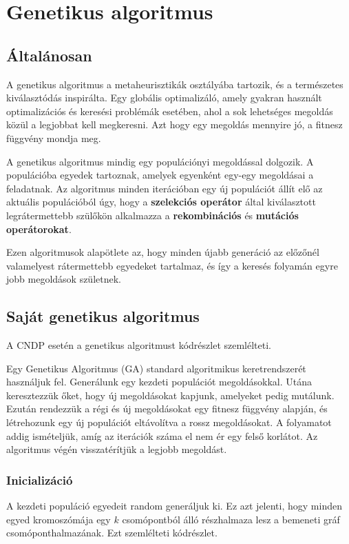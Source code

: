 \section{Genetikus algoritmus}\label{sec:GENETIKUS_ALGORITMUS}


\subsection{Általánosan}
A genetikus algoritmus a metaheurisztikák osztályába tartozik, és a természetes kiválasztódás inspirálta.
Egy globális optimalizáló, amely gyakran használt optimalizációs és keresési problémák esetében,
ahol a sok lehetséges megoldás közül a legjobbat kell megkeresni.
Azt hogy egy megoldás mennyire jó, a fitnesz függvény mondja meg.

A genetikus algoritmus mindig egy populációnyi megoldással dolgozik.
A populációba egyedek tartoznak, amelyek egyenként egy-egy megoldásai a feladatnak.
Az algoritmus minden iterációban egy új populációt állít elő az aktuális populációból úgy,
hogy a \textbf{szelekciós operátor} által kiválasztott legrátermettebb szülőkön alkalmazza a
\textbf{rekombinációs} és \textbf{mutációs operátorokat}.

Ezen algoritmusok alapötlete az, hogy minden újabb generáció
az előzőnél valamelyest rátermettebb egyedeket tartalmaz, és így a keresés folyamán
egyre jobb megoldások születnek.

\subsection{Saját genetikus algoritmus}
A CNDP esetén a genetikus algoritmust  kódrészlet szemlélteti.


Egy Genetikus Algoritmus (GA) standard algoritmikus keretrendszerét használjuk fel.
Generálunk egy kezdeti populációt megoldásokkal. Utána keresztezzük őket, hogy új megoldásokat kapjunk,
amelyeket pedig mutálunk. Ezután rendezzük a régi és új megoldásokat egy fitnesz függvény alapján,
és létrehozunk egy új populációt eltávolítva a rossz megoldásokat.
A folyamatot addig ismételjük, amíg az iterációk száma el nem ér egy felső korlátot.
Az algoritmus végén visszatérítjük a legjobb megoldást.

\subsubsection{Inicializáció}
A kezdeti populáció egyedeit random generáljuk ki. Ez azt jelenti,
hogy minden egyed kromoszómája egy $k$ csomópontból álló részhalmaza lesz
a bemeneti gráf csomóponthalmazának. Ezt szemlélteti  kódrészlet.


